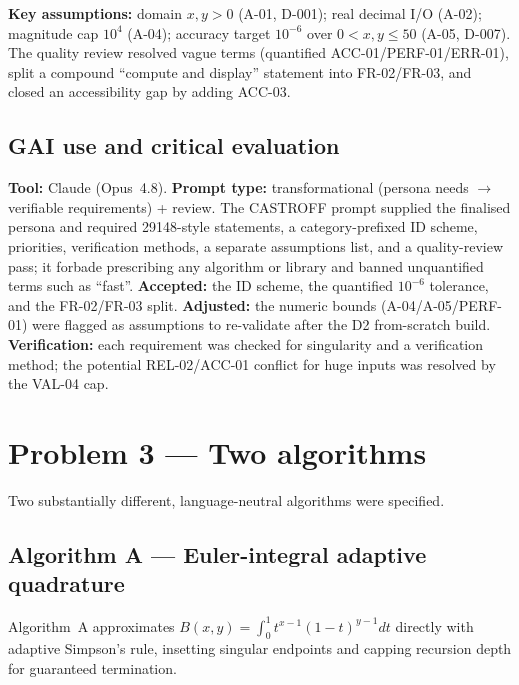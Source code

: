 \documentclass[11pt,a4paper]{article}
\begin{document}
\noindent\textbf{Key assumptions:} domain $x,y>0$ (A-01, D-001); real decimal I/O
(A-02); magnitude cap $10^4$ (A-04); accuracy target $10^{-6}$ over $0<x,y\le 50$
(A-05, D-007). The quality review resolved vague terms (quantified ACC-01/PERF-01/ERR-01),
split a compound ``compute and display'' statement into FR-02/FR-03, and closed an
accessibility gap by adding ACC-03.

\subsection{GAI use and critical evaluation}
\textbf{Tool:} Claude (Opus~4.8). \textbf{Prompt type:} transformational (persona needs
$\rightarrow$ verifiable requirements) + review. The CASTROFF prompt supplied the finalised
persona and required 29148-style statements, a category-prefixed ID scheme, priorities,
verification methods, a separate assumptions list, and a quality-review pass; it forbade
prescribing any algorithm or library and banned unquantified terms such as ``fast''.
\textbf{Accepted:} the ID scheme, the quantified $10^{-6}$ tolerance, and the FR-02/FR-03
split. \textbf{Adjusted:} the numeric bounds (A-04/A-05/PERF-01) were flagged as
assumptions to re-validate after the D2 from-scratch build. \textbf{Verification:} each
requirement was checked for singularity and a verification method; the potential
REL-02/ACC-01 conflict for huge inputs was resolved by the VAL-04 cap.

\section{Problem 3 --- Two algorithms}
\label{sec:p3}

Two substantially different, language-neutral algorithms were specified.

\subsection{Algorithm A --- Euler-integral adaptive quadrature}
Algorithm~A approximates $B(x,y)=\int_0^1 t^{x-1}(1-t)^{y-1}dt$ directly with adaptive
Simpson's rule, insetting singular endpoints and capping recursion depth for guaranteed
termination.
\end{document}
